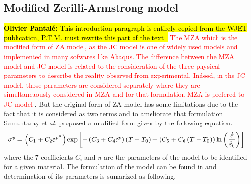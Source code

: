 \documentclass[twoside,english,1p,final,sort&compress]{elsarticle}
\makeatletter
\theoremstyle{plain}
\newcommand{\mdot}[1]{\accentset{\mbox{\bfseries .}}{#1}}
\newcommand*{\eal}{et \emph{al.}\@\xspace}
\DeclareRobustCommand{\OP}[1]{ {\begingroup\sethlcolor{VWyellow}\textcolor{red}{\hl{\textbf{Olivier Pantal\'e:} #1}}\endgroup} }
\makeatother
\begin{document}
\subsection{Modified Zerilli-Armstrong model\label{sec:MZA}}
\OP{This introduction paragraph is entirely copied from the WJET publication, P.T.M.
must rewrite this part of the text !}
\textcolor{red}{The MZA which is the modified form of ZA model, as the JC model is one of widely used models and implemented in many sofwares like Abaqus.
The difference between the MZA model and JC model is related to the consideration of the three physical parameters to describe the reality observed from experimental.
Indeed, in the JC model, those parameters are considered separately where they are simultaneaously considered in MZA and for that formulation MZA is prefered to JC model} \cite{Hull-2011}.
But the original form of ZA model has some limitations due to the fact that it is considered as two terms and to ameliorate that formulation Samantaray \eal \cite{Samantaray-2009} proposed a modified form given by the following equation:
\begin{equation}
\label{eq:MZA-model}
\sigma^y = \left(C_{1}+C_{2}\varepsilon^{p^n}\right) \exp\left[-\left(C_{3}+C_{4}\varepsilon^p\right)\left(T-T_0\right) + \left(C_{5}+C_{6}\left(T-T_0\right)\right)\ln\left( \frac{\mdot\varepsilon}{\mdot{\varepsilon}_0}\right)\right]
\end{equation}
where the $7$ coefficients $C_i$ and $n$ are the parameters of the model to be identified for a given material.
The formulation of the model can be found in \cite{Samantaray-2009} and determination of its parameters is sumarized as following.
\end{document}

